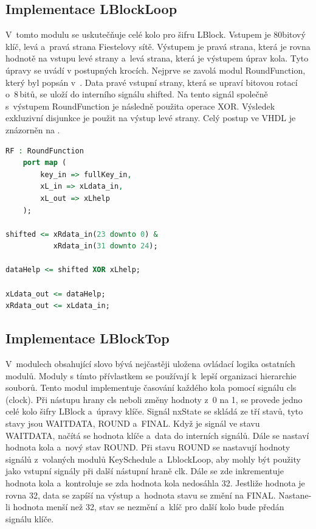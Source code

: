 \subsection{Implementace LBlockLoop\label{subsec:loop}}
V~tomto modulu se uskutečňuje celé kolo pro šifru LBlock. Vstupem je 80bitový klíč, levá a~pravá strana Fiestelovy sítě. Výstupem je pravá strana, která je rovna hodnotě na vstupu levé strany a~levá strana, která je výstupem úprav kola. Tyto úpravy se uvádí v postupných krocích. Nejprve se zavolá modul RoundFunction, který byl popsán v~. Data pravé vstupní strany, která se upraví bitovou rotací o~8\,bitů, se uloží do interního signálu shifted. Na tento signál společně s~výstupem RoundFunction je následně použita operace XOR. Výsledek exkluzivní disjunkce je použit na výstup levé strany. Celý postup ve VHDL je znázorněn na .
\begin{lstlisting}[language=VHDL, caption=LBlockLoop, frame=single, label={vyp:loop}]
RF : RoundFunction 
    port map (
        key_in => fullKey_in,
        xL_in => xLdata_in,
        xL_out => xLhelp
    );

shifted <= xRdata_in(23 downto 0) & 
           xRdata_in(31 downto 24);

dataHelp <= shifted XOR xLhelp;

xLdata_out <= dataHelp;
xRdata_out <= xLdata_in;
\end{lstlisting}

\subsection{Implementace LBlockTop}
V~modulech obsahující slovo  bývá nejčastěji uložena ovládací logika ostatních modulů. Moduly s tímto přívlastkem se používají k~lepší organizaci hierarchie souborů. Tento modul implementuje časování každého kola pomocí signálu cls (clock). Při nástupu hrany cls neboli změny hodnoty z~0 na 1, se provede jedno celé kolo šifry LBlock a~úpravy klíče. Signál nxState se skládá ze tří stavů, tyto stavy jsou WAITDATA, ROUND a~FINAL. Když je signál ve stavu WAITDATA, načítá se hodnota klíče a~data do interních signálů. Dále se nastaví hodnota kola a~nový stav ROUND. Při stavu ROUND se nastavují hodnoty signálů z~volaných modulů KeySchedule a~LblockLoop, aby mohly být použity jako vstupní signály při další nástupní hraně clk. Dále se zde inkrementuje hodnota kola a~kontroluje se zda hodnota kola nedosáhla 32. Jestliže hodnota je rovna 32, data se zapíší na výstup a~hodnota stavu se změní na FINAL. Nastane-li hodnota menší než 32, stav se nezmění a~klíč pro další kolo bude předán signálu klíče.

